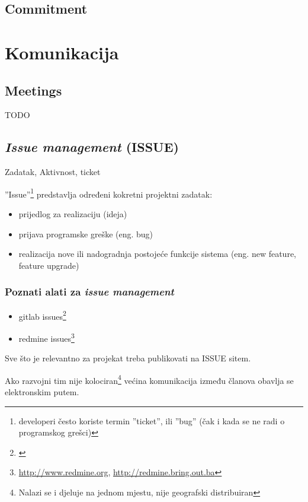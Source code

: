 \documentclass[lmodern, utf8, zavrsni]{fit}
\begin{document}
\section{Commitment}

\chapter{Komunikacija}

\section{Meetings}


TODO

\section{\emph{Issue management} (ISSUE)}

Zadatak, Aktivnost, ticket

''Issue''\footnote{developeri često koriste termin ''ticket'', ili ''bug'' (čak i kada se ne radi o programskog grešci)} predstavlja određeni kokretni projektni zadatak:
\begin{itemize}
  \item prijedlog za realizaciju (ideja)
  \item prijava programske greške (eng. bug)
  \item realizacija nove ili nadogradnja postojeće funkcije sistema (eng. new feature, feature upgrade)
\end{itemize}

\subsection{Poznati alati za \emph{issue management}}

\begin{itemize}
  \item gitlab issues\footnote{\citep{agilegit}}
  \item redmine issues\footnote{\url{http://www.redmine.org}, \url{http://redmine.bring.out.ba}}
\end{itemize}

Sve što je relevantno za projekat treba publikovati na ISSUE sitem.

Ako razvojni tim nije kolociran\footnote{Nalazi se i djeluje na jednom mjestu, nije geografski distribuiran} većina komunikacija između članova obavlja se elektronskim putem.
\end{document}
